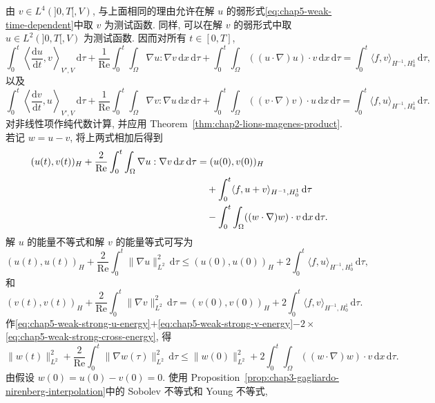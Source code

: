 \begin{Proof}
由 $v\in L^4(]0,T[,V)$, 与上面相同的理由允许在解 $u$ 的弱形式\eqref{eq:chap5-weak-time-dependent}中取 $v$ 为测试函数. 同样, 可以在解 $v$ 的弱形式中取 $u\in L^2(]0,T[,V)$ 为测试函数. 因而对所有 $t\in[0,T]$,
\[
 \int_0^t\left\langle\frac{\mathrm du}{\mathrm dt},v\right\rangle_{V',V}\,\mathrm d\tau
 +\frac1{\operatorname{Re}}\int_0^t\int_\Omega\nabla u:\nabla v\,\mathrm dx\,\mathrm d\tau
 +\int_0^t\int_\Omega((u\cdot\nabla)u)\cdot v\,\mathrm dx\,\mathrm d\tau
 =\int_0^t\langle f,v\rangle_{H^{-1},H_0^1}\,\mathrm d\tau,
\]
以及
\[
 \int_0^t\left\langle\frac{\mathrm dv}{\mathrm dt},u\right\rangle_{V',V}\,\mathrm d\tau
 +\frac1{\operatorname{Re}}\int_0^t\int_\Omega\nabla v:\nabla u\,\mathrm dx\,\mathrm d\tau
 +\int_0^t\int_\Omega((v\cdot\nabla)v)\cdot u\,\mathrm dx\,\mathrm d\tau
 =\int_0^t\langle f,u\rangle_{H^{-1},H_0^1}\,\mathrm d\tau.
\]
对非线性项作纯代数计算, 并应用 Theorem~\ref{thm:chap2-lions-magenes-product}. 若记 $w=u-v$, 将上两式相加后得到
\begin{align}
 (u(t),v(t))_H
 +\frac2{\operatorname{Re}}\int_0^t\int_\Omega\nabla u:\nabla v\,\mathrm dx\,\mathrm d\tau
 &=(u(0),v(0))_H\notag\\
 &\quad+\int_0^t\langle f,u+v\rangle_{H^{-1},H_0^1}\,\mathrm d\tau\notag\\
 &\quad-\int_0^t\int_\Omega((w\cdot\nabla)w)\cdot v\,\mathrm dx\,\mathrm d\tau.
\label{eq:chap5-weak-strong-cross-energy}
\end{align}
解 $u$ 的能量不等式和解 $v$ 的能量等式可写为
\begin{equation}
 (u(t),u(t))_H+\frac2{\operatorname{Re}}\int_0^t\|\nabla u\|_{L^2}^2\,\mathrm d\tau
 \leq(u(0),u(0))_H+2\int_0^t\langle f,u\rangle_{H^{-1},H_0^1}\,\mathrm d\tau,
\label{eq:chap5-weak-strong-u-energy}
\end{equation}
和
\begin{equation}
 (v(t),v(t))_H+\frac2{\operatorname{Re}}\int_0^t\|\nabla v\|_{L^2}^2\,\mathrm d\tau
 =(v(0),v(0))_H+2\int_0^t\langle f,v\rangle_{H^{-1},H_0^1}\,\mathrm d\tau.
\label{eq:chap5-weak-strong-v-energy}
\end{equation}
作\eqref{eq:chap5-weak-strong-u-energy}$+$\eqref{eq:chap5-weak-strong-v-energy}$-2\times$\eqref{eq:chap5-weak-strong-cross-energy}, 得
\[
 \|w(t)\|_{L^2}^2+\frac2{\operatorname{Re}}\int_0^t\|\nabla w(\tau)\|_{L^2}^2\,\mathrm d\tau
 \leq\|w(0)\|_{L^2}^2
 +2\int_0^t\int_\Omega((w\cdot\nabla)w)\cdot v\,\mathrm dx\,\mathrm d\tau.
\]
由假设 $w(0)=u(0)-v(0)=0$. 使用 Proposition~\ref{prop:chap3-gagliardo-nirenberg-interpolation}中的 Sobolev 不等式和 Young 不等式,

\end{Proof}
